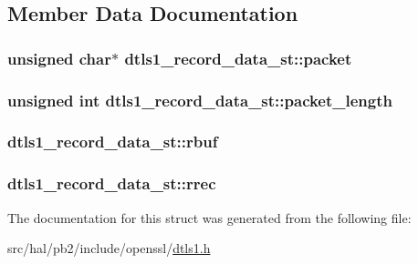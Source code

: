 \subsection{Member Data Documentation}
\subsubsection[{\texorpdfstring{packet}{packet}}]{\setlength{\rightskip}{0pt plus 5cm}unsigned char$\ast$ dtls1\+\_\+record\+\_\+data\+\_\+st\+::packet}\hypertarget{structdtls1__record__data__st_af010cf2b401153c4312245f1d62edc95}{}\label{structdtls1__record__data__st_af010cf2b401153c4312245f1d62edc95}
\subsubsection[{\texorpdfstring{packet\+\_\+length}{packet_length}}]{\setlength{\rightskip}{0pt plus 5cm}unsigned int dtls1\+\_\+record\+\_\+data\+\_\+st\+::packet\+\_\+length}\hypertarget{structdtls1__record__data__st_a37b63c2a75775b814e855a5fc59dca26}{}\label{structdtls1__record__data__st_a37b63c2a75775b814e855a5fc59dca26}
\subsubsection[{\texorpdfstring{rbuf}{rbuf}}]{ dtls1\+\_\+record\+\_\+data\+\_\+st\+::rbuf}\hypertarget{structdtls1__record__data__st_ae1bd1518437b259efb71f1a80b612213}{}\label{structdtls1__record__data__st_ae1bd1518437b259efb71f1a80b612213}
\subsubsection[{\texorpdfstring{rrec}{rrec}}]{ dtls1\+\_\+record\+\_\+data\+\_\+st\+::rrec}\hypertarget{structdtls1__record__data__st_a4b62074b684a63163d87bfbf27bc8453}{}\label{structdtls1__record__data__st_a4b62074b684a63163d87bfbf27bc8453}


The documentation for this struct was generated from the following file\+:\begin{DoxyCompactItemize}
\item 
src/hal/pb2/include/openssl/\hyperlink{dtls1_8h}{dtls1.\+h}\end{DoxyCompactItemize}
